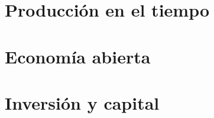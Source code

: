 \documentclass[8pt,a4paper]{extarticle}
\begin{document}
\begin{multicols}{3}
\newpage

\part{Producción en el tiempo}

\newpage

\part{Economía abierta}

\newpage

\part{Inversión y capital}

\vfill\eject
\columnbreak
\end{multicols}
\end{document}
